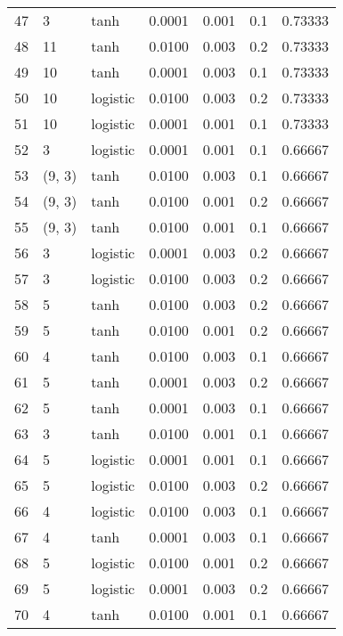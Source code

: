 \begin{tabular}{lllrrrr}
47  &           3 &      tanh &  0.0001 &  0.001 &  0.1 &   0.73333 \\
48  &          11 &      tanh &  0.0100 &  0.003 &  0.2 &   0.73333 \\
49  &          10 &      tanh &  0.0001 &  0.003 &  0.1 &   0.73333 \\
50  &          10 &  logistic &  0.0100 &  0.003 &  0.2 &   0.73333 \\
51  &          10 &  logistic &  0.0001 &  0.001 &  0.1 &   0.73333 \\
52  &           3 &  logistic &  0.0001 &  0.001 &  0.1 &   0.66667 \\
53  &      (9, 3) &      tanh &  0.0100 &  0.003 &  0.1 &   0.66667 \\
54  &      (9, 3) &      tanh &  0.0100 &  0.001 &  0.2 &   0.66667 \\
55  &      (9, 3) &      tanh &  0.0100 &  0.001 &  0.1 &   0.66667 \\
56  &           3 &  logistic &  0.0001 &  0.003 &  0.2 &   0.66667 \\
57  &           3 &  logistic &  0.0100 &  0.003 &  0.2 &   0.66667 \\
58  &           5 &      tanh &  0.0100 &  0.003 &  0.2 &   0.66667 \\
59  &           5 &      tanh &  0.0100 &  0.001 &  0.2 &   0.66667 \\
60  &           4 &      tanh &  0.0100 &  0.003 &  0.1 &   0.66667 \\
61  &           5 &      tanh &  0.0001 &  0.003 &  0.2 &   0.66667 \\
62  &           5 &      tanh &  0.0001 &  0.003 &  0.1 &   0.66667 \\
63  &           3 &      tanh &  0.0100 &  0.001 &  0.1 &   0.66667 \\
64  &           5 &  logistic &  0.0001 &  0.001 &  0.1 &   0.66667 \\
65  &           5 &  logistic &  0.0100 &  0.003 &  0.2 &   0.66667 \\
66  &           4 &  logistic &  0.0100 &  0.003 &  0.1 &   0.66667 \\
67  &           4 &      tanh &  0.0001 &  0.003 &  0.1 &   0.66667 \\
68  &           5 &  logistic &  0.0100 &  0.001 &  0.2 &   0.66667 \\
69  &           5 &  logistic &  0.0001 &  0.003 &  0.2 &   0.66667 \\
70  &           4 &      tanh &  0.0100 &  0.001 &  0.1 &   0.66667 \\

\end{tabular}
